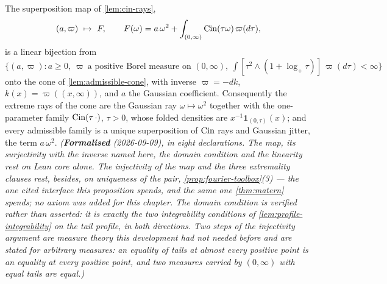 \begin{proposition}\label{prop:choquet-cone}
\leanok
{}
The superposition map of \ref{lem:cin-rays},
\[
  (a,\varpi) \ \mapsto\ F, \qquad
  F(\omega) = a\,\omega^2 + \int_{(0,\infty)} \operatorname{Cin}(\tau\omega)\,\varpi(d\tau),
\]
is a linear bijection from
$\bigl\{(a,\varpi) : a \ge 0,\ \varpi \ \text{a positive Borel measure on } (0,\infty),\
\int [\tau^2 \wedge (1 + \log_+\tau)]\,\varpi(d\tau) < \infty\bigr\}$
onto the cone of \ref{lem:admissible-cone}, with inverse $\varpi = -dk$, $k(x) =
\varpi((x,\infty))$, and $a$ the Gaussian coefficient. Consequently the extreme rays of the
cone are the Gaussian ray $\omega \mapsto \omega^2$ together with the one-parameter family
$\operatorname{Cin}(\tau\,\cdot)$, $\tau > 0$, whose folded \Levy{} densities are
$x^{-1}\mathbf 1_{(0,\tau)}(x)$; and every admissible family is a unique superposition of
$\operatorname{Cin}$ rays and Gaussian jitter, the term $a\,\omega^2$.
\statusT\quad\emph{(\textbf{Formalised} (2026-09-09), in eight declarations. The map, its
surjectivity with the inverse named here, the domain condition and the linearity rest on Lean
core alone. The injectivity of the map and the three extremality clauses rest, besides, on
uniqueness of the \Levy{} pair, \ref{prop:fourier-toolbox}(3) --- the one cited interface this
proposition spends, and the same one \ref{thm:matern} spends; no axiom was added for this
chapter. The domain condition is verified rather than asserted: it is
exactly the two integrability conditions of \ref{lem:profile-integrability} on the tail
profile, in both directions. Two steps of the injectivity argument are measure theory this
development had not needed before and are stated for arbitrary measures: an equality of tails
at almost every positive point is an equality at every positive point, and two measures carried
by $(0,\infty)$ with equal tails are equal.)}
\end{proposition}

